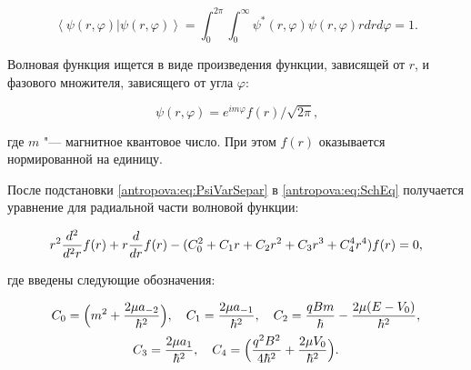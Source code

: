 \begin{equation*}

\left<\psi(r,\varphi)\vert\psi(r,\varphi)\right>=\int_0^{2\pi}\int_0^{\infty}\psi^{\ast}(r,\varphi)\psi(r,\varphi) r dr d\varphi=1 \text{.}

\end{equation*}



\smallskip





Волновая функция ищется в виде произведения функции, зависящей от $r$, и фазового множителя, зависящего от угла $\varphi$:

\begin{equation}

\label{antropova:eq:PsiVarSepar}

\psi(r,\varphi)=e^{im\varphi}f(r)/\sqrt{2\pi}\text{,}

\end{equation}

где $m$ "--- магнитное квантовое число.  При этом $f(r)$ оказывается нормированной на единицу.

После подстановки \eqref{antropova:eq:PsiVarSepar} в \eqref{antropova:eq:SchEq} получается уравнение для радиальной части волновой функции:

\begin{equation}

\label{antropova:eq:PsiRadialPart}

r^2\antropovaDiffn{f(r)}{r}{2} + r\antropovaDiff{f(r)}{r}-(C_0^2 + C_1r + C_2r^2 + C_3r^3 + C_4^4r^4)f(r)=0 \text{,}

\end{equation}

где введены следующие обозначения:

\begin{equation}

\label{antropova:eq:Ci}

\begin{array}{c}

\displaystyle

C_0 = \Bigl(m^2 + \frac{2\mu{}a_{-2}}{\hbar^2}\Bigr), \quad 

C_1 = \frac{2\mu{}a_{-1}}{\hbar^2}, \quad 

C_2 = \frac{qBm}{\hbar} - \frac{2\mu(E - V_0)}{\hbar^2}, \\[3mm]

\displaystyle

C_3 = \frac{2\mu{}a_1}{\hbar^2}, \quad 

C_4 = \Bigl(\frac{q^2B^2}{4\hbar^2} + \frac{2\mu{}V_0}{\hbar^2}\Bigr).

\end{array}

\end{equation}





